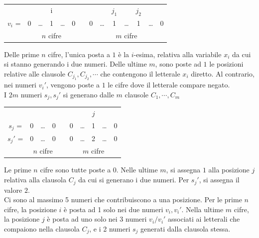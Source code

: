 \begin{center}
    \begin{tabular}[h]{*{14}{c}}
                &   &        & i &        &   &        &   &        &$j_1$&        &$j_2$&        &    \\
       \cline{2-14}
        $v_i$ = & 0 & \ldots & 1 & \ldots & 0 & \vline & 0 & \ldots & 1   & \ldots & 1   & \ldots & 0  \\
       \cline{2-14}
                & \multicolumn{5}{c}{$n$ cifre}&\vline & \multicolumn{7}{c}{$m$ cifre}
    \end{tabular}
\end{center}
Delle prime $n$ cifre, l'unica posta a $1$ è la $i$-esima, relativa alla variabile $x_i$ da cui si stanno generando i due numeri. Delle ultime $m$, sono poste ad $1$ le posizioni relative alle clausole $C_{j_1}, C_{j_2}, \cdots$ che contengono il letterale $x_i$ diretto. Al contrario, nei numeri $v_i'$, vengono poste a $1$ le cifre dove il letterale compare negato.
\\
I $2m$ numeri $s_j, s_j'$ si generano dalle $m$ clausole $C_1, \cdots, C_m$
\begin{center}
    \begin{tabular}[h]{*{10}{c}}
                &   &        &   &        &   &        &$j$ &        &     \\
       \cline{2-10}
        $s_j$ = & 0 & \ldots & 0 & \vline & 0 & \ldots & 1  & \ldots &  0  \\
       $s_j'$ = & 0 & \ldots & 0 & \vline & 0 & \ldots & 2  & \ldots &  0  \\
       \cline{2-10}
                & \multicolumn{3}{c}{$n$ cifre}
                                 & \vline & \multicolumn{5}{c}{$m$ cifre}
    \end{tabular}
\end{center}
Le prime $n$ cifre sono tutte poste a $0$. Nelle ultime $m$, si assegna $1$ alla posizione $j$ relativa alla clausola $C_j$ da cui si generano i due numeri. Per $s_j'$, si assegna il valore $2$.
\\
Ci sono al massimo 5 numeri che contribuiscono a una posizione.
Per le prime $n$ cifre, la posizione $i$ è posta ad 1 solo nei due numeri $v_i, v_i'$.
Nella ultime $m$ cifre, la posizione $j$ è posta ad uno solo nei 3 numeri $v_i / v_i'$ associati ai letterali che compaiono nella clausola $C_j$, e i 2 numeri $s_j$ generati dalla clausola stessa.
